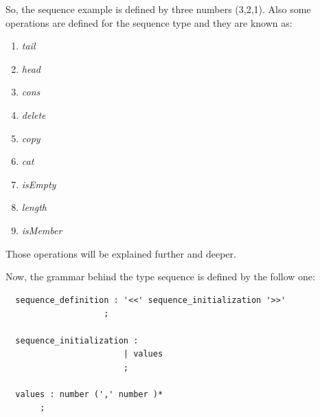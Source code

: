 \documentclass[
  oneside,
  11pt, a4paper,
  footinclude=true,
  headinclude=true,
  cleardoublepage=empty
]{scrbook}
\begin{document}
So, the sequence example is defined by three numbers (3,2,1). 
Also some operations are defined for the sequence type and they are known as:
\begin{enumerate}
\item \textit{tail}
\item \textit{head}
\item \textit{cons}
\item \textit{delete}
\item \textit{copy}
\item \textit{cat}
\item \textit{isEmpty}
\item \textit{length}
\item \textit{isMember}
\end{enumerate}
Those operations will be explained further and deeper.

Now, the grammar behind the type sequence is defined by the follow one:

\begin{lstlisting}
  sequence_definition : '<<' sequence_initialization '>>'
                    ;

  sequence_initialization :
                        | values
                        ;

  values : number (',' number )*
       ;

\end{lstlisting}





\end{document}
